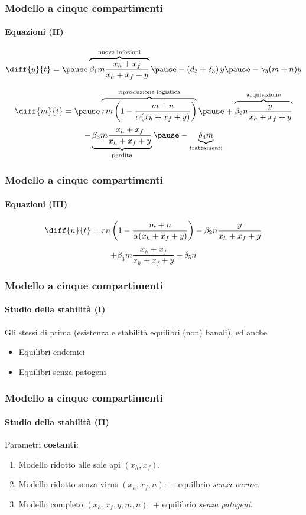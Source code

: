 \documentclass[]{beamer} %
\begin{document}
\begin{frame}
    \frametitle{Modello a cinque compartimenti}
    \framesubtitle{Equazioni (II)}

    $$\diff{y}{t} = \pause \overbrace{ \beta_1 m \frac{x_h + x_f}{x_h + x_f + y} }^{\text{nuove infezioni}} %
    \pause - \left( d_3 + \delta_3 \right) y  %
    \pause - \gamma_3 (m+n) y $$

    $$\diff{m}{t} = \pause \overbrace{ rm \left( 1 - \frac{m+n}{ \alpha (x_h + x_f + y) } \right) %
        }^{\text{riproduzione logistica}}%
        \pause + \overbrace{ \beta_2 n \frac{y}{x_h + x_f + y} }^{\text{acquisizione}}$$
    \pause
    $$- \underbrace{ \beta_3 m \frac{x_h + x_f}{x_h + x_f + y} }_{\text{perdita}} %
        \pause -\underbrace{ \delta_4 m }_{\text{trattamenti}} $$
\end{frame}


\begin{frame}
    \frametitle{Modello a cinque compartimenti}
    \framesubtitle{Equazioni (III)}

    $$\diff{n}{t} = rn \left( 1 - \frac{m+n}{ \alpha (x_h + x_f + y) } \right) - \beta_2 n \frac{y}{x_h + x_f + y}$$
    $$+ \beta_3 m \frac{x_h + x_f}{x_h + x_f + y} - \delta_5 n$$
\end{frame}



\begin{frame}
    \frametitle{Modello a cinque compartimenti}
    \framesubtitle{Studio della stabilità (I)}

    Gli stessi di prima (esistenza e stabilità equilibri (non) banali), \pause
    ed anche
    \begin{itemize}
        \item Equilibri endemici
        \item \pause Equilibri senza patogeni
    \end{itemize}
\end{frame}

\begin{frame}
    \frametitle{Modello a cinque compartimenti}
    \framesubtitle{Studio della stabilità (II)}

    Parametri \textbf{costanti}:
    \begin{enumerate}
        \item \pause Modello ridotto alle sole api $(x_h, x_f)$.
        \item \pause Modello ridotto senza virus $(x_h, x_f, n)$: + equilbrio \emph{senza varroe}.
        \item \pause Modello completo $(x_h, x_f, y, m, n)$: + equilibrio \emph{senza patogeni}.
    \end{enumerate}
\end{frame}
\end{document}
